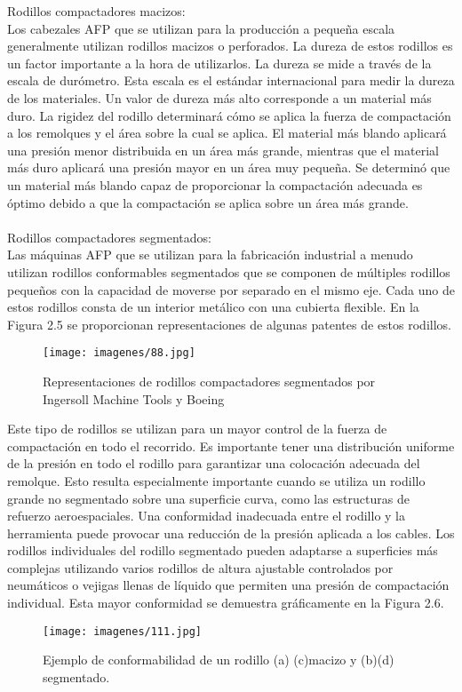 Rodillos compactadores macizos:\\
Los cabezales AFP que se utilizan para la producción a pequeña escala generalmente utilizan rodillos macizos o perforados. La dureza de estos rodillos es un factor importante a la hora de utilizarlos. La dureza se mide a través de la escala de durómetro. Esta escala es el estándar internacional para medir la dureza de los materiales. Un valor de dureza más alto corresponde a un material más duro. La rigidez del rodillo determinará cómo se aplica la fuerza de compactación a los remolques y el área sobre la cual se aplica. El material más blando aplicará una presión menor distribuida en un área más grande, mientras que el material más duro aplicará una presión mayor en un área muy pequeña. Se determinó que un material más blando capaz de proporcionar la compactación adecuada es óptimo debido a que la compactación se aplica sobre un área más grande.\\\\
Rodillos compactadores segmentados:\\
Las máquinas AFP que se utilizan para la fabricación industrial a menudo utilizan rodillos conformables segmentados que se componen de múltiples rodillos pequeños con la capacidad de moverse por separado en el mismo eje. Cada uno de estos rodillos consta de un interior metálico con una cubierta flexible. En la Figura 2.5 se proporcionan representaciones de algunas patentes de estos rodillos.
 \begin{figure}[H]
\begin{center}
\texttt{[image: imagenes/88.jpg]}
\caption{Representaciones de rodillos compactadores segmentados por Ingersoll Machine Tools y Boeing}
\label{afp}
\end{center}
\end{figure}
 Este tipo de rodillos se utilizan para un mayor control de la fuerza de compactación en todo el recorrido. Es importante tener una distribución uniforme de la presión en todo el rodillo para garantizar una colocación adecuada del remolque. Esto resulta especialmente importante cuando se utiliza un rodillo grande no segmentado sobre una superficie curva, como las estructuras de refuerzo aeroespaciales. Una conformidad inadecuada entre el rodillo y la herramienta puede provocar una reducción de la presión aplicada a los cables. Los rodillos individuales del rodillo segmentado pueden adaptarse a superficies más complejas utilizando varios rodillos de altura ajustable controlados por neumáticos o vejigas llenas de líquido que permiten una presión de compactación individual. Esta mayor conformidad se demuestra gráficamente en la Figura 2.6. 
  \begin{figure}[H]
\begin{center}
\texttt{[image: imagenes/111.jpg]}
\caption{Ejemplo de conformabilidad de un rodillo (a) (c)macizo y (b)(d) segmentado.}
\label{afp}
\end{center}
\end{figure}
 

